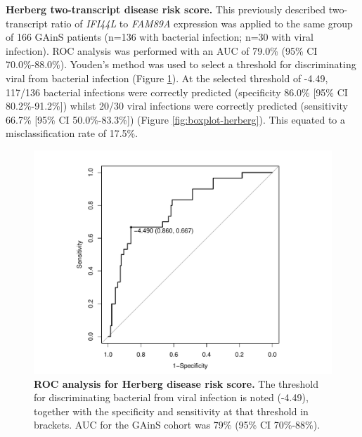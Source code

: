 \textbf{Herberg two-transcript disease risk score.} This previously described two-transcript ratio of \textit{IFI44L} to \textit{FAM89A} expression was applied to the same group of 166 GAinS patients (n=136 with bacterial infection; n=30 with viral infection). ROC analysis was performed with an AUC of 79.0\% (95\% CI 70.0\%-88.0\%). Youden's method was used to select a threshold for discriminating viral from bacterial infection (Figure \ref{fig:roc-herberg}). At the selected threshold of -4.49, 117/136 bacterial infections were correctly predicted (specificity 86.0\% [95\% CI 80.2\%-91.2\%]) whilst 20/30 viral infections were correctly predicted (sensitivity 66.7\% [95\% CI 50.0\%-83.3\%]) (Figure \ref{fig:boxplot-herberg}). This equated to a misclassification rate of 17.5\%.

\FloatBarrier
\begin{figure}[htbp]
\centering
\includegraphics[scale=0.6]{./Results3/Images/Herberg-ROC.pdf}
\caption[ROC analysis for Herberg disease risk score]{\textbf{ROC analysis for Herberg disease risk score.} The threshold for discriminating bacterial from viral infection is noted (-4.49), together with the specificity and sensitivity at that threshold in brackets. AUC for the GAinS cohort was 79\% (95\% CI 70\%-88\%).}
\label{fig:roc-herberg}
\end{figure}


